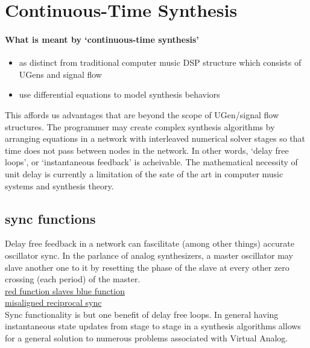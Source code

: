 \documentclass{article}
\begin{document}
\section{Continuous-Time Synthesis}
\paragraph{What is meant by `continuous-time synthesis'}
\begin{itemize}
\item as distinct from traditional computer music DSP structure which consists of UGens and signal flow
\item use differential equations to model synthesis behaviors
\end{itemize}
This affords us advantages that are beyond the scope of UGen/signal flow structures. The programmer may create complex synthesis algorithms by arranging equations in a network with interleaved numerical solver stages so that time does not pass between nodes in the network. In other words, `delay free loops', or `instantaneous feedback' is acheivable. The mathematical necessity of unit delay is currently a limitation of the sate of the art in computer music systems and synthesis theory.

\subsection{sync functions}
Delay free feedback in a network can fascilitate (among other things) accurate oscillator sync. In the parlance of analog synthesizers, a master oscillator may slave another one to it by resetting the phase of the slave at every other zero crossing (each period) of the master.\\ 
\href{./sync4.pdf}{red function slaves blue function}\\
\href{./sync6.pdf}{misaligned reciprocal sync}\\

Sync functionality is but one benefit of delay free loops. In general having instantaneous state updates from stage to stage in a synthesis algorithms allows for a general solution to numerous problems associated with Virtual Analog.
\end{document}
